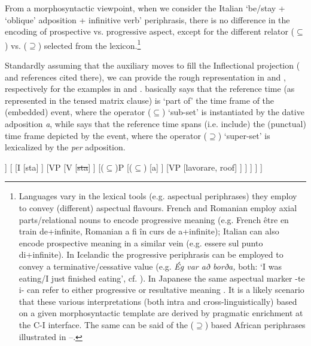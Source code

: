 \documentclass[output=paper,modfonts,nonflat,newtxmath,colorlinks,citecolor=brown]{langsci/langscibook}
\begin{document}
From a morphosyntactic viewpoint, when we consider the Italian ‘be/stay + ‘oblique’ adposition + infinitive verb’ periphrasis, there is no difference in the encoding of prospective {vs}. progressive aspect, except for the different relator  (${\subseteq}$) {vs}. (${\supseteq}$) selected from the lexicon.\footnote{Languages vary in the lexical tools (e.g. aspectual periphrases) they employ to convey (different) aspectual flavours. French and Romanian employ axial parts/relational nouns \citep{Svenonius2006axial} to encode progressive meaning (e.g. French {être en train de}+infinite, Romanian {a fi în curs de a}+infinite); Italian can also encode prospective meaning in a similar vein (e.g. {essere sul punto di+}infinite).  In Icelandic the progressive periphrasis can be employed to convey a terminative/cessative value (e.g. \textit{Ég var að borða,} both: ‘I was eating/I just finished eating’, cf. \citealt{Johannsdottir2011}). In Japanese the same aspectual marker {{}-te i-} can refer to either progressive or resultative meaning \citep{Shirai1998}. It is a likely scenario that these various interpretations (both intra and cross-linguistically) based on a given morphosyntactic template are derived by pragmatic enrichment at the C-I interface. The same can be said of the (\textrm{${\supseteq}$}) based African periphrases illustrated in --.} 

Standardly assuming that the auxiliary moves to fill the Inflectional projection (\citealt{ManziniLorussoSavoia2017} and references cited there), we can provide the rough representation in  and , respectively for the examples in and .  basically says that the reference time (as represented in the tensed matrix clause) is ‘part of’ the time frame of the (embedded) event, where the operator (${\subseteq}$) ‘sub-set’  is instantiated by the dative adposition \textit{a}, while  says that the reference time spans (i.e. include) the (punctual) time frame depicted by the event, where the operator (${\supseteq}$) ‘super-set’ is lexicalized by the \textit{per} adposition.%

\ea%
    \label{ex:franco:25}
    \begin{forest}
    	[IP
    		[DP
    			[Gianni]
    		]
    		[
    			[I
    				[sta]
    			]
    			[VP
    				[V
    					[\sout{sta}]
    				]	
    				[($\subseteq$)P
    					[($\subseteq$)
    						[a]
    					]
    					[VP
    						[lavorare, roof]
    					]
    				]
    			]
    		]
    	]
    	\end{forest}
    \z
    
\end{document}
